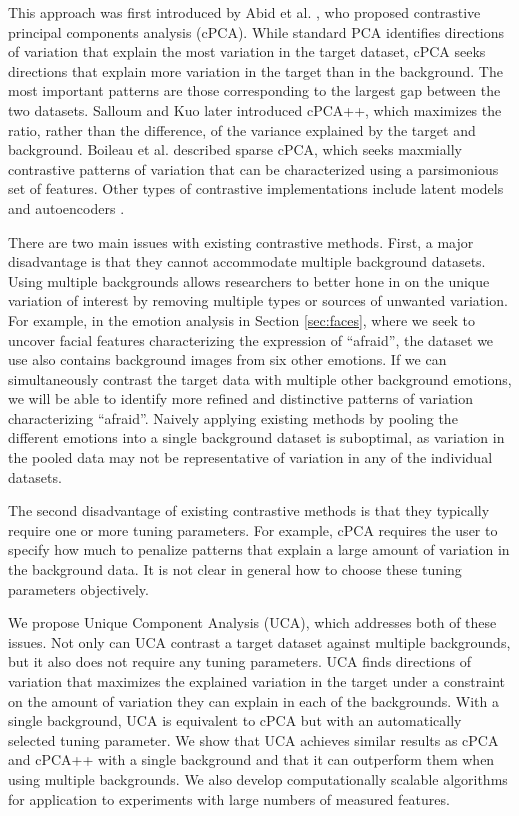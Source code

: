 \documentclass[nocrop]{bioinfo}
\begin{document}
This approach was first introduced by Abid et al. \cite{Abid}, who proposed contrastive principal components analysis (cPCA). While standard PCA identifies directions of variation that explain the most variation in the target dataset, cPCA seeks directions that explain more variation in the target than in the background. The most important patterns are those corresponding to the largest gap between the two datasets. Salloum and Kuo \cite{Salloum} later introduced cPCA++, which maximizes the ratio, rather than the difference, of the variance explained by the target and background. Boileau et al. \cite{Boileau} described sparse cPCA, which seeks maxmially contrastive patterns of variation that can be characterized using a parsimonious set of features. Other types of contrastive implementations include latent models \cite{severson2019unsupervised} and autoencoders \cite{cautoencoder}.

There are two main issues with existing contrastive methods. First, a major disadvantage is that they cannot accommodate multiple background datasets. Using multiple backgrounds allows researchers to better hone in on the unique variation of interest by removing multiple types or sources of unwanted variation.
For example, in the emotion analysis in Section \ref{sec:faces}, where we seek to uncover facial features characterizing the expression of ``afraid'', the dataset we use also contains background images from six other emotions. If we can simultaneously contrast the target data with multiple other background emotions, we will be able to identify more refined and distinctive patterns of variation characterizing ``afraid''. Naively applying existing methods by pooling the different emotions into a single background dataset is suboptimal, as variation in the pooled data may not be representative of variation in any of the individual datasets.

The second disadvantage of existing contrastive methods is that they typically require one or more tuning parameters. For example, cPCA requires the user to specify how much to penalize patterns that explain a large amount of variation in the background data. It is not clear in general how to choose these tuning parameters objectively.

We propose Unique Component Analysis (UCA), which addresses both of these issues. 
Not only can UCA contrast a target dataset against multiple backgrounds, but it also does not require any tuning parameters. UCA finds directions of variation that maximizes the explained variation in the target under a constraint on the amount of variation they can explain in each of the backgrounds. With a single background, UCA is equivalent to cPCA but with an automatically selected tuning parameter. We show that UCA achieves similar results as cPCA and cPCA++ with a single background and that it can outperform them when using multiple backgrounds. We also develop computationally scalable algorithms for application to experiments with large numbers of measured features.
\end{document}
